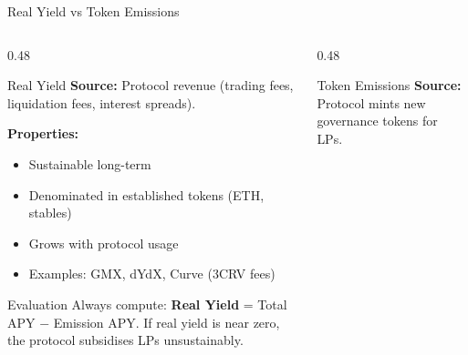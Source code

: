 \documentclass[8pt,aspectratio=169]{beamer}
\begin{document}
\begin{frame}{Real Yield vs Token Emissions}
  \begin{columns}[T]
    \begin{column}{0.48\textwidth}
      \begin{block}{Real Yield}
        \textbf{Source:} Protocol revenue (trading fees, liquidation fees, interest spreads).

        \vspace{2mm}
        \textbf{Properties:}
        \begin{itemize}\setlength\itemsep{2pt}
          \item Sustainable long-term
          \item Denominated in established tokens (ETH, stables)
          \item Grows with protocol usage
          \item Examples: GMX, dYdX, Curve (3CRV fees)
        \end{itemize}
      \end{block}
      \begin{alertblock}{Evaluation}
        Always compute: \textbf{Real Yield} = Total APY $-$ Emission APY.
        If real yield is near zero, the protocol subsidises LPs unsustainably.
      \end{alertblock}
    \end{column}
    \begin{column}{0.48\textwidth}
      \begin{block}{Token Emissions}
        \textbf{Source:} Protocol mints new governance tokens for LPs.


\end{block}
\end{column}
\end{columns}
\end{frame}
\end{document}
